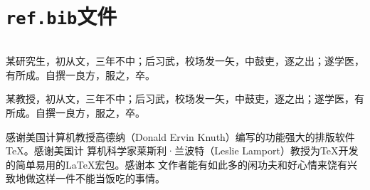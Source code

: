 \documentclass{swfuthesism}
\begin{document}
\inputminted{latex}{swfuthesism.cls}

\chapter{\texttt{ref.bib}文件}
\label{app:bib}

\inputminted{bibtex}{ref.bib}


\doublespacing

\begin{authorInfo}
  某研究生，初从文，三年不中；后习武，校场发一矢，中鼓吏，逐之出；遂学医，有所成。自撰一良方，服之，卒。
\end{authorInfo}

\begin{advisorInfo}
  某教授，初从文，三年不中；后习武，校场发一矢，中鼓吏，逐之出；遂学医，有所成。自撰一良方，服之，卒。
\end{advisorInfo}


\begin{acknowledgment}
  感谢美国计算机教授高德纳（Donald Ervin Knuth）编写的功能强大的排版软件\TeX{}。感谢美国计
  算机科学家莱斯利·兰波特（Leslie Lamport）教授为\TeX{}开发的简单易用的\LaTeX{}宏包。感谢本
  文作者能有如此多的闲功夫和好心情来饶有兴致地做这样一件不能当饭吃的事情。
\end{acknowledgment}
\end{document}
